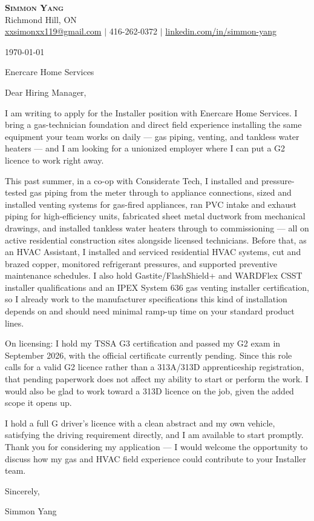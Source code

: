 \documentclass[letterpaper,11pt]{article}
\begin{document}
\begin{center}
    \textbf{\Huge \scshape Simmon Yang} \\ \vspace{1pt}
    Richmond Hill, ON \\
    \href{mailto:xxsimonxx119@gmail.com}{xxsimonxx119@gmail.com} $|$ 416-262-0372 $|$
    \href{https://www.linkedin.com/in/simmon-yang/}{linkedin.com/in/simmon-yang}
\end{center}

\vspace{10pt}

\today

Enercare Home Services

Dear Hiring Manager,

I am writing to apply for the Installer position with Enercare Home Services. I bring a gas-technician foundation and direct field experience installing the same equipment your team works on daily --- gas piping, venting, and tankless water heaters --- and I am looking for a unionized employer where I can put a G2 licence to work right away.

This past summer, in a co-op with Considerate Tech, I installed and pressure-tested gas piping from the meter through to appliance connections, sized and installed venting systems for gas-fired appliances, ran PVC intake and exhaust piping for high-efficiency units, fabricated sheet metal ductwork from mechanical drawings, and installed tankless water heaters through to commissioning --- all on active residential construction sites alongside licensed technicians. Before that, as an HVAC Assistant, I installed and serviced residential HVAC systems, cut and brazed copper, monitored refrigerant pressures, and supported preventive maintenance schedules. I also hold Gastite/FlashShield+ and WARDFlex CSST installer qualifications and an IPEX System 636 gas venting installer certification, so I already work to the manufacturer specifications this kind of installation depends on and should need minimal ramp-up time on your standard product lines.

On licensing: I hold my TSSA G3 certification and passed my G2 exam in September 2026, with the official certificate currently pending. Since this role calls for a valid G2 licence rather than a 313A/313D apprenticeship registration, that pending paperwork does not affect my ability to start or perform the work. I would also be glad to work toward a 313D licence on the job, given the added scope it opens up.

I hold a full G driver's licence with a clean abstract and my own vehicle, satisfying the driving requirement directly, and I am available to start promptly. Thank you for considering my application --- I would welcome the opportunity to discuss how my gas and HVAC field experience could contribute to your Installer team.

Sincerely,

Simmon Yang
\end{document}
